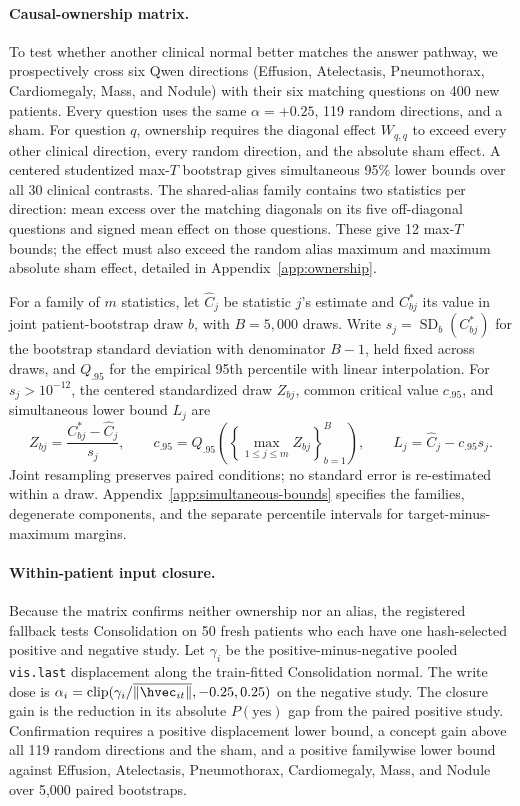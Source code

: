 \paragraph{Causal-ownership matrix.}
To test whether another clinical normal better matches the answer pathway, we prospectively cross six Qwen directions (Effusion, Atelectasis, Pneumothorax, Cardiomegaly, Mass, and Nodule) with their six matching questions on 400 new patients. Every question uses the same $\alpha=+0.25$, 119 random directions, and a sham. For question $q$, ownership requires the diagonal effect $W_{q,q}$ to exceed every other clinical direction, every random direction, and the absolute sham effect. A centered studentized max-$T$ bootstrap gives simultaneous 95\% lower bounds over all 30 clinical contrasts. The shared-alias family contains two statistics per direction: mean excess over the matching diagonals on its five off-diagonal questions and signed mean effect on those questions. These give 12 max-$T$ bounds; the effect must also exceed the random alias maximum and maximum absolute sham effect, detailed in Appendix~\ref{app:ownership}.

For a family of $m$ statistics, let $\widehat C_j$ be statistic $j$'s estimate and $C^*_{bj}$ its value in joint patient-bootstrap draw $b$, with $B=5{,}000$ draws. Write $s_j=\operatorname{SD}_{b}(C^*_{bj})$ for the bootstrap standard deviation with denominator $B-1$, held fixed across draws, and $Q_{.95}$ for the empirical 95th percentile with linear interpolation. For $s_j>10^{-12}$, the centered standardized draw $Z_{bj}$, common critical value $c_{.95}$, and simultaneous lower bound $L_j$ are
\begin{equation}
Z_{bj}=\frac{C^*_{bj}-\widehat C_j}{s_j},\qquad
c_{.95}=Q_{.95}\!\left(\left\{\max_{1\leq j\leq m}Z_{bj}\right\}_{b=1}^{B}\right),\qquad
L_j=\widehat C_j-c_{.95}s_j.
\label{eq:max-t}
\end{equation}
Joint resampling preserves paired conditions; no standard error is re-estimated within a draw. Appendix~\ref{app:simultaneous-bounds} specifies the families, degenerate components, and the separate percentile intervals for target-minus-maximum margins.

\paragraph{Within-patient input closure.}
Because the matrix confirms neither ownership nor an alias, the registered fallback tests Consolidation on 50 fresh patients who each have one hash-selected positive and negative study. Let $\gamma_i$ be the positive-minus-negative pooled \texttt{vis.last} displacement along the train-fitted Consolidation normal. The write dose is $\alpha_i=\operatorname{clip}(\gamma_i/\overline{\lVert \hvec_{it}\rVert},-0.25,0.25)$ on the negative study. The closure gain is the reduction in its absolute $P(\mathrm{yes})$ gap from the paired positive study. Confirmation requires a positive displacement lower bound, a concept gain above all 119 random directions and the sham, and a positive familywise lower bound against Effusion, Atelectasis, Pneumothorax, Cardiomegaly, Mass, and Nodule over 5,000 paired bootstraps.

